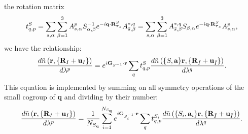 \documentclass[12pt,a4paper,twoside]{report}
\begin{document}
the rotation matrix
\begin{equation}
t_{q,p}^S=
\sum_{s,\alpha}
\sum_{\beta=1}^3 A^p_{s,\alpha} S^{-1}_{\alpha,\beta} e^{-i{\bf q}\cdot {\bf R}^S_{{\boldsymbol{\tau}_s}}} A^{*,q}_{\bar s,\beta} = \sum_{s,\alpha}
\sum_{\beta=1}^3 A^{*,q}_{\bar s,\beta} S_{\beta,\alpha} e^{-i{\bf q}\cdot {\bf R}^S_{{\boldsymbol{\tau}_s}}} A^p_{s,\alpha},
\label{tnotr}
\end{equation}
we have the relationship:
\begin{equation}
{d \tilde n\left({\bf r}, \{{\bf R}_I + {\bf u}_I\}\right) \over d \lambda^p} = e^{i{\bf G}_{S^{-1}} \cdot {\bf r}}
\sum_q t_{q,p}^S {d \tilde n\left(\{S,{\bf a}\} {\bf r}, \{{\bf R}_{\bar I} + {\bf u}_{\bar I}\}\right) \over d \lambda^q}. 
\end{equation}
This equation is implemented by summing on all symmetry operations of the small cogroup of
{\bf q} and dividing by their number:
\begin{equation}
{d \tilde n\left({\bf r}, \{{\bf R}_I + {\bf u}_I\}\right) \over d \lambda^p} = {1\over N_{S_{\bf q}}} \sum_{i=1}^{N_{S_{\bf q}}} e^{i{\bf G}_{S_i^{-1}} \cdot {\bf r}}
\sum_q t_{q,p}^{S_i} {d \tilde n\left(\{S_i,{\bf a}_i\} {\bf r}, \{{\bf R}_{\bar I} + {\bf u}_{\bar I}\}\right) \over d \lambda^q}.
\label{drho_irrep}
\end{equation}
\end{document}

